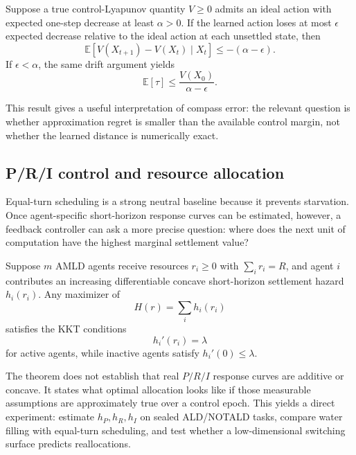 \begin{theorem}
Suppose a true control-Lyapunov quantity $V\ge0$ admits an ideal action with expected one-step decrease at least $\alpha>0$. If the learned action loses at most $\epsilon$ expected decrease relative to the ideal action at each unsettled state, then
\[
 \mathbb E[V(X_{t+1})-V(X_t)\mid X_t]\le-(\alpha-\epsilon).
\]
If $\epsilon<\alpha$, the same drift argument yields
\[
 \mathbb E[\tau]\le \frac{V(X_0)}{\alpha-\epsilon}.
\]
\end{theorem}

This result gives a useful interpretation of compass error: the relevant question is whether approximation regret is smaller than the available control margin, not whether the learned distance is numerically exact.

\subsection{P/R/I control and resource allocation}
Equal-turn scheduling is a strong neutral baseline because it prevents starvation. Once agent-specific short-horizon response curves can be estimated, however, a feedback controller can ask a more precise question: where does the next unit of computation have the highest marginal settlement value?

\begin{theorem}
Suppose $m$ AMLD agents receive resources $r_i\ge0$ with $\sum_i r_i=R$, and agent $i$ contributes an increasing differentiable concave short-horizon settlement hazard $h_i(r_i)$. Any maximizer of
\[
 H(r)=\sum_i h_i(r_i)
\]
satisfies the KKT conditions
\[
 h_i'(r_i)=\lambda
\]
for active agents, while inactive agents satisfy $h_i'(0)\le\lambda$.
\end{theorem}

The theorem does not establish that real $P/R/I$ response curves are additive or concave. It states what optimal allocation looks like if those measurable assumptions are approximately true over a control epoch. This yields a direct experiment: estimate $h_P,h_R,h_I$ on sealed ALD/NOTALD tasks, compare water filling with equal-turn scheduling, and test whether a low-dimensional switching surface predicts reallocations.

